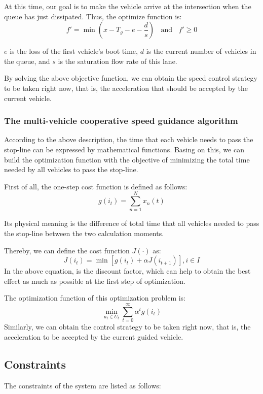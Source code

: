 \documentclass[10.5pt,compsoc]{TsT}
\theoremstyle{mystyle}
\begin{document}
{\begin{enumerate}
At this time, our goal is to make the vehicle arrive at the intersection
when the queue has just dissipated. Thus, the optimize function is:
$$f'=\min(x-T_g-e-\frac{d}{s}) \ \ \ \ \text{and}\ \ \ \ f' \ge 0$$

$e$ is the loss of the first vehicle's boot time, $d$ is the current number of
vehicles in the queue, and $s$ is the saturation flow rate of this lane.
\end{enumerate}
By solving the above objective function, we can obtain the speed control
strategy to be taken right now, that is, the acceleration that should be
accepted by the current vehicle.


\subsubsection{The multi-vehicle cooperative speed guidance algorithm}

According to the above description, the time that each vehicle needs to
pass the stop-line can be expressed by mathematical functions. Basing on
this, we can build the optimization function with the objective of
minimizing the total time needed by all vehicles to pass the stop-line.

First of all, the one-step cost function is defined as follows:
$$g(i_t)=\sum_{n=1}^Nx_n(t)$$

Its physical meaning is the difference of total time that all vehicles
needed to pass the stop-line between the two calculation moments.

Thereby, we can define the cost function $J(\cdot)$ as:
$$J(i_t)=\min[g(i_t)+\alpha J(i_{t+1})], i \in I$$
In the above equation, is the discount factor, which can help to obtain
the best effect as much as possible at the first step of optimization.

The optimization function of this optimization problem is:
$$\min\limits_{u_t\in U_t}\sum_{t=0}^\infty \alpha^tg(i_t)$$
Similarly, we can obtain the control strategy to be taken right now,
that is, the acceleration to be accepted by the current guided vehicle.

\subsection{Constraints}


The constraints of the system are listed as follows:

}
\end{document}
